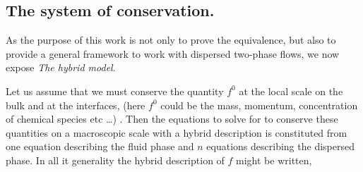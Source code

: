 \subsection{The system of conservation.}

As the purpose of this work is not only to prove the equivalence, but also to provide a general framework to work with dispersed two-phase flows, we now expose \textit{The hybrid model}.

Let us assume that we must conserve the quantity $f^0$ at the local scale on the bulk and at the interfaces, (here $f^0$ could be the mass, momentum, concentration of chemical species etc \ldots) . 
Then the equations to solve for to conserve these quantities on a macroscopic scale with a hybrid description is constituted from one equation describing the fluid phase and $n$ equations describing the dispersed phase.  
In all it generality the hybrid description of $f$ might be written,
